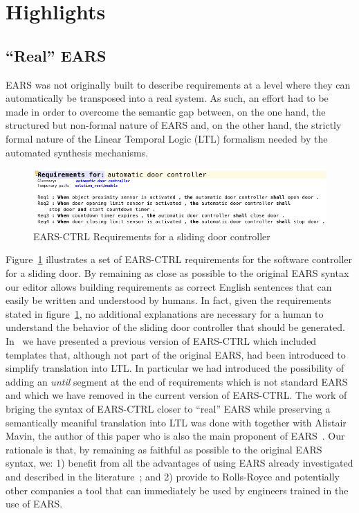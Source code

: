 \section{Highlights}

\subsection{``Real'' EARS}

EARS was not originally built to describe requirements at a level where they can
automatically be transposed into a real system. As such, an effort had to be
made in order to overcome the semantic gap between, on the one hand, the
structured but non-formal nature of EARS and, on the other hand, the strictly
formal nature of the Linear Temporal Logic (LTL) formalism needed by the
automated synthesis mechanisms.


\begin{figure}[h!]
   \begin{center}
     \includegraphics[width=1\textwidth]{images/EARS-Reqs.png}
     \caption{\textsf{EARS-CTRL} Requirements for a sliding door
     controller}
     \label{fig:ears_reqs}
   \end{center}
 \end{figure}
 
Figure~\ref{fig:ears_reqs} illustrates a set of \textsf{EARS-CTRL} requirements
for the software controller for a sliding door. By remaining as close as
possible to the original EARS syntax our editor allows building requirements as
correct English sentences that can easily be written and understood by humans.
In fact, given the requirements stated in figure~\ref{fig:ears_reqs}, no
additional explanations are necessary for a human to understand the behavior of
the sliding door controller that should be generated. In~\cite{LucioRCM17} we
have presented a previous version of \textsf{EARS-CTRL} which included templates
that, although not part of the original EARS, had been introduced to simplify
translation into LTL. In particular we had introduced the possibility of adding
an \emph{until} segment at the end of requirements which is not standard EARS
and which we have removed in the current version of \textsf{EARS-CTRL}.
The work of briging the syntax of \textsf{EARS-CTRL} closer to ``real'' EARS while preserving a semantically
meaniful translation into LTL was done with together with Alistair Mavin, the
author of this paper who is also the main proponent of EARS~\cite{EARS09}.
Our rationale is that, by remaining as faithful as possible to the original EARS
syntax, we: 1) benefit from all the advantages of using EARS already
investigated and described in the literature~\cite{EARS09,EARS16}; and 2)
provide to Rolls-Royce and potentially other companies a tool that can
immediately be used by engineers trained in the use of EARS.

